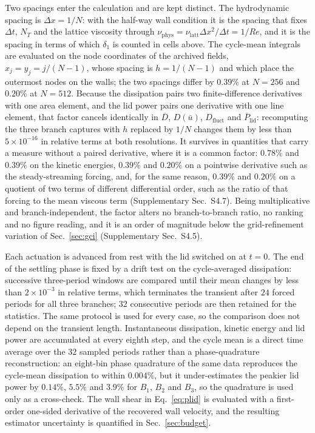\documentclass[11pt,a4paper]{article}
\newenvironment{chgadd}{\par\color{blue}}{\par\color{black}}
\begin{document}
\begin{chgadd}
Two spacings enter the calculation and are kept distinct. The hydrodynamic
spacing is $\Delta x=1/N$: with the half-way wall condition it is the spacing that
fixes $\Delta t$, $N_T$ and the lattice viscosity through
$\nu_{\mathrm{phys}}=\nu_{\mathrm{latt}}\Delta x^{2}/\Delta t=1/Re$, and it is the
spacing in terms of which $\delta_1$ is counted in cells above. The cycle-mean
integrals are evaluated on the node coordinates of the archived fields,
$x_j=y_j=j/(N-1)$, whose spacing is $h=1/(N-1)$ and which place the outermost nodes
on the walls; the two spacings differ by $0.39\%$ at $N=256$ and $0.20\%$ at
$N=512$. Because the dissipation pairs two finite-difference derivatives with one
area element, and the lid power pairs one derivative with one line element, that
factor cancels identically in
$\overline{D}$, $D(\bar{u})$, $D_{\mathrm{fluct}}$ and
$\overline{P}_{\mathrm{lid}}$: recomputing the three branch captures with $h$
replaced by $1/N$ changes them by less than $5\times10^{-16}$ in relative terms at
both resolutions. It survives in quantities that carry a measure without a
paired derivative, where it is a common factor: $0.78\%$ and $0.39\%$ on the kinetic
energies, $0.39\%$ and $0.20\%$ on a pointwise derivative such as the
steady-streaming forcing, and, for the same reason, $0.39\%$ and $0.20\%$ on a
quotient of two terms of different differential order, such as the ratio of that
forcing to the mean viscous term (Supplementary Sec.~S4.7). Being multiplicative and
branch-independent, the factor alters no
branch-to-branch ratio, no ranking and no figure reading, and it is an order of
magnitude below the
grid-refinement variation of Sec.~\ref{sec:gci} (Supplementary Sec.~S4.5).

Each actuation is advanced from rest with the lid switched on at $t=0$. The end of
the settling phase is fixed by a drift test on the cycle-averaged dissipation:
successive three-period windows are compared until their mean changes by less than
$2\times10^{-3}$ in relative terms, which terminates the transient after $24$
forced periods for all three branches; $32$ consecutive periods are then retained
for the statistics. The same protocol is used for every case, so the comparison
does not depend on the transient length. Instantaneous dissipation, kinetic energy
and lid power are accumulated at every eighth step, and the cycle mean is a direct
time average over the $32$ sampled periods rather than a phase-quadrature
reconstruction: an eight-bin phase quadrature of the same data reproduces the
cycle-mean dissipation to within $0.004\%$, but it under-estimates the peakier lid
power by $0.14\%$, $5.5\%$ and $3.9\%$ for $B_1$, $B_2$ and $B_3$, so the
quadrature is used only as a cross-check. The wall
shear in Eq.~\eqref{eq:plid} is evaluated with a first-order one-sided derivative
of the recovered wall velocity, and the resulting estimator uncertainty
is quantified in Sec.~\ref{sec:budget}.


\end{chgadd}
\end{document}
